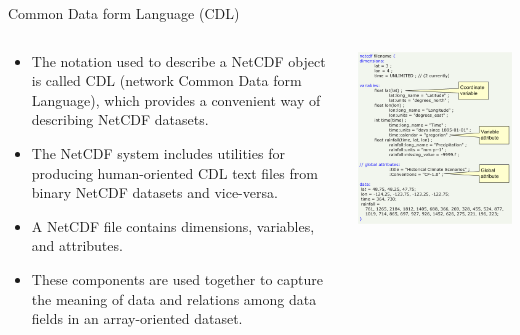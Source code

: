 \documentclass[compress,11pt,xcolor=svgnames,aspectratio=169]{beamer}
\begin{document}
\begin{frame}[fragile]{Common Data form Language (CDL)}

\vspace*{-0.5cm}

\begin{columns}

\begin{column}{0.5\textwidth}

{\footnotesize

  \begin{itemize}
  \setlength\itemsep{0.3cm}
    \item The notation used to describe a NetCDF object is called CDL (network Common Data form Language), which provides a convenient way of describing NetCDF datasets.
    \item The NetCDF system includes utilities for producing human-oriented CDL text files from binary NetCDF datasets and vice-versa.
    \item A NetCDF file contains dimensions, variables, and attributes.
    \item These components are used together to capture the meaning of data and relations among data fields in an array-oriented dataset.
  \end{itemize}
}

\end{column}

\begin{column}{0.4\textwidth}
\begin{center}
\includegraphics[scale=0.45]{fig/netcdf-cdl}
\end{center}
\end{column}

\end{columns}

\end{frame}
\end{document}
